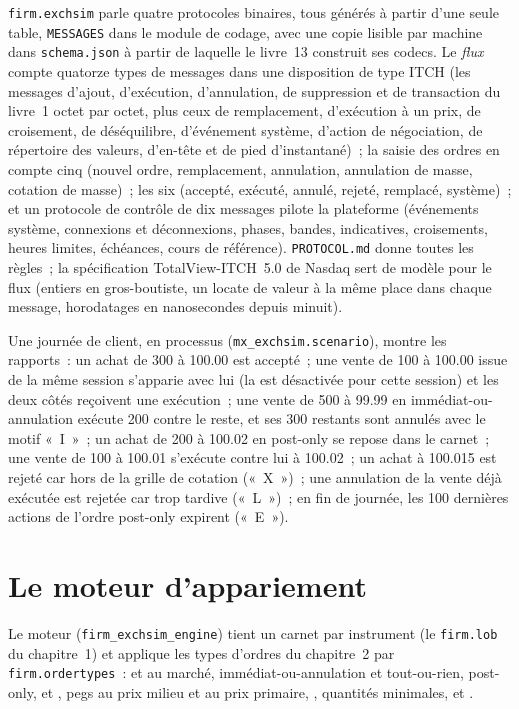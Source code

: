 \texttt{firm.exchsim} parle quatre protocoles binaires, tous générés à partir d'une seule table, \texttt{MESSAGES} dans le module de codage, avec une copie lisible par machine
dans \texttt{schema.json} à partir de laquelle le livre~13 construit ses codecs. Le \emph{flux} compte quatorze types de messages dans une disposition de type ITCH (les messages d'ajout, d'exécution, d'annulation, de suppression et de transaction du livre~1
octet par octet, plus ceux de remplacement, d'exécution à un prix, de croisement, de déséquilibre, d'événement système, d'action de négociation,
de répertoire des valeurs, d'en-tête et de pied d'instantané)~; la saisie des ordres en compte cinq (nouvel ordre, remplacement, annulation, annulation de masse, cotation de masse)~; les  six (accepté, exécuté,
annulé, rejeté, remplacé, système)~; et un protocole de contrôle de dix messages pilote la plateforme (événements système, connexions et déconnexions, phases, bandes,
indicatives, croisements, heures limites, échéances, cours de référence). \texttt{PROTOCOL.md} donne toutes les règles~; la spécification TotalView-ITCH~5.0 de Nasdaq sert de modèle pour le
flux (entiers en gros-boutiste, un locate de valeur à la même place dans chaque message, horodatages en nanosecondes depuis minuit).

Une journée de client, en processus (\texttt{mx\_exchsim.scenario}), montre les rapports~: un achat de 300 à 100.00 est accepté~; une vente de 100 à 100.00 issue de la
même session s'apparie avec lui (la  est désactivée pour cette session) et les deux côtés reçoivent une exécution~; une vente de 500 à
99.99 en immédiat-ou-annulation exécute 200 contre le reste, et ses 300 restants sont annulés avec le motif «~I~»~; un achat de 200 à 100.02 en post-only se repose dans le carnet~; une vente de 100 à
100.01 s'exécute contre lui à 100.02~; un achat à 100.015 est rejeté car hors de la grille de cotation («~X~»)~; une annulation de la vente déjà exécutée est rejetée car trop
tardive («~L~»)~; en fin de journée, les 100 dernières actions de l'ordre post-only expirent («~E~»).

\section{Le moteur d'appariement}

Le moteur (\texttt{firm\_exchsim\_engine}) tient un carnet par instrument (le \texttt{firm.lob} du chapitre~1) et applique les types d'ordres du chapitre~2 par
\texttt{firm.ordertypes}~:  et au marché, immédiat-ou-annulation et tout-ou-rien, post-only,  et , pegs au prix milieu et au prix primaire,
, quantités minimales, et .

